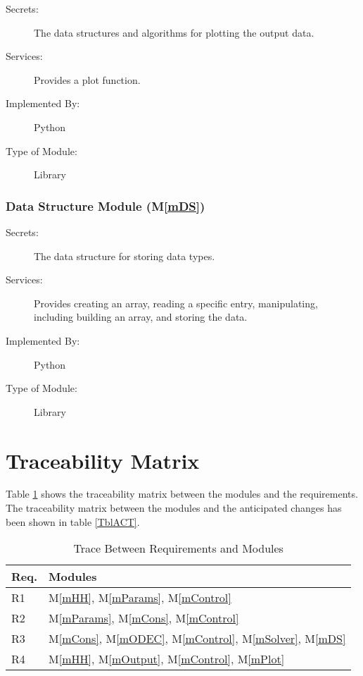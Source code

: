 \documentclass[12pt, titlepage]{article}
\newcommand{\mref}[1]{M\ref{#1}}
\begin{document}
\begin{description}
\item[Secrets:] The data structures and algorithms for plotting the output data.
\item[Services:] Provides a plot function.
\item[Implemented By:] Python
\item[Type of Module:] Library
\end{description}

\subsubsection{ Data Structure Module (\mref{mDS})}

\begin{description}
\item[Secrets:] The data structure for storing data types.
\item[Services:] Provides creating an array, reading a specific entry, manipulating, including building an array, and storing the data.
\item[Implemented By:] Python
\item[Type of Module:] Library
\end{description}

\section{Traceability Matrix} \label{SecTM}

Table \ref{TblRT} shows the traceability matrix between the modules and the
requirements. The traceability matrix between the modules and the anticipated changes has been shown in table \ref{TblACT}.

\begin{table}[H]
\centering
\begin{tabular}{p{} p{}}
\toprule
\textbf{Req.} & \textbf{Modules}\\
\midrule
R1 &  \mref{mHH}, \mref{mParams}, \mref{mControl}\\
R2 & \mref{mParams}, \mref{mCons}, \mref{mControl}\\
R3 & \mref{mCons}, \mref{mODEC}, \mref{mControl}, \mref{mSolver}, \mref{mDS}\\
R4 & \mref{mHH}, \mref{mOutput}, \mref{mControl}, \mref{mPlot}\\

\bottomrule
\end{tabular}
\caption{Trace Between Requirements and Modules}
\label{TblRT}
\end{table}
\end{document}
